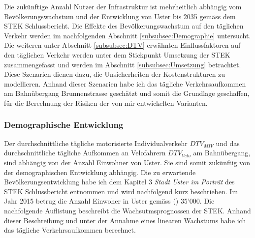 %
%
%
%

\label{subsec:Szenarien}

Die zukünftige Anzahl Nutzer der Infrastruktur ist mehrheitlich abhängig vom Bevölkerungswachstum und der Entwicklung von Uster bis 2035 gemäss dem STEK Schlussbericht.
Die Effekte des Bevölkerungswachstum auf den täglichen Verkehr werden im nachfolgenden Abschnitt \ref{subsubsec:Demographie} untersucht.  
Die weiteren unter Abschnitt \ref{subsubsec:DTV} erwähnten Einflussfaktoren auf den täglichen Verkehr werden unter dem Stickpunkt Umsetzung der STEK zusammengefasst und werden im Abschnitt \ref{subsubsec:Umsetzung} betrachtet.
Diese Szenarien dienen dazu, die Unsicherheiten der Kostenstrukturen zu modellieren.
Anhand dieser Szenarien habe ich das tägliche Verkehrsaufkommen am Bahnübergang Brunnenstrasse geschätzt und somit die Grundlage geschaffen, für die Berechnung der Risiken der von mir entwickelten Varianten.


\subsubsection*{Demographische Entwicklung}
\label{subsubsec:Demographie}

Der durchschnittliche tägliche motorisierte Individualverkehr $DTV_{MIV}$ und das durchschnittliche tägliche  Aufkommen an Velofahrern $DTV_{Velo}$ am Bahnübergang, sind abhängig von der Anzahl Einwohner von Uster. Sie sind somit zukünftig von der demographischen Entwicklung abhängig. 
Die zu erwartende Bevölkerungsentwicklung habe ich dem Kapitel 3 \textit{Stadt Uster im Porträt} des STEK Schlussbericht entnommen und wird nachfolgend kurz beschrieben.
Im Jahr 2015 betrug die Anzahl Einwoher in Uster gemäss (\cite{STEK}) 35'000. Die nachfolgende Auflistung beschreibt die Wachsutmsprognossen der STEK. Anhand dieser Beschreibung und unter der Annahme eines linearen Wachstums habe ich das tägliche Verkehrsaufkommen berechnet.

